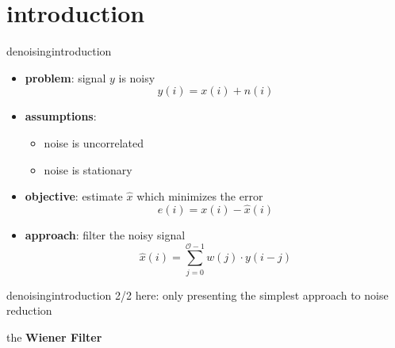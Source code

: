 



\subtitle{Part 27: Denoising}


	

\section[intro]{introduction}
	\begin{frame}{denoising}{introduction}
		\begin{itemize}
			\item	\textbf{problem}: signal $y$ is noisy
                \begin{equation*}
                    y(i) = x(i) + n(i)                    
                \end{equation*}
            \pause
            \item   \textbf{assumptions}:
                \begin{itemize}
                    \item   noise is uncorrelated
                    \item   noise is stationary
                \end{itemize}
            \pause
            \smallskip \item   \textbf{objective}: estimate $\hat{x}$ which minimizes the error
                \begin{equation*}
                    e(i)  = x(i) - \hat{x}(i)
                \end{equation*}
            \pause
            \item   \textbf{approach}: filter the noisy signal
                \begin{equation*}
                    \hat{x}(i) = \sum\limits_{j=0}^{\mathcal{O}-1} w(j)\cdot y(i-j)
                \end{equation*}
		\end{itemize}
	\end{frame}
    \begin{frame}{denoising}{introduction 2/2}
        here: only presenting the simplest approach to noise reduction
        
        
        \pause
        \bigskip
        the \textbf{Wiener Filter}
	\end{frame}

